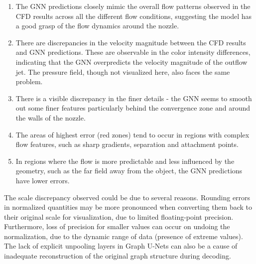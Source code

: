 \begin{enumerate}
\item The GNN predictions closely mimic the overall flow patterns observed in the CFD results across all the different flow conditions, suggesting the model has a good grasp of the flow dynamics around the nozzle.
\item  There are discrepancies in the velocity magnitude between the CFD results and GNN predictions. These are observable in the color intensity differences, indicating that the GNN overpredicts the velocity magnitude of the outflow jet. The pressure field, though not visualized here, also faces the same problem. 
\item There is a visible discrepancy in the finer details - the GNN seems to smooth out some finer features particularly behind the convergence zone and around the walls of the nozzle.
\item The areas of highest error (red zones) tend to occur in regions with complex flow features, such as sharp gradients, separation and attachment points.
\item  In regions where the flow is more predictable and less influenced by the geometry, such as the far field away from the object, the GNN predictions have lower errors.
\end{enumerate}
The scale discrepancy observed could be due to several reasons. Rounding errors in normalized quantities may be more pronounced when converting them back to their original scale for visualization, due to limited floating-point precision. Furthermore, loss of precision for smaller values can occur on undoing the normalization, due to the dynamic range of data (presence of extreme values). The lack of explicit unpooling layers in Graph U-Nets can also be a cause of inadequate reconstruction of the original graph structure during decoding. 
